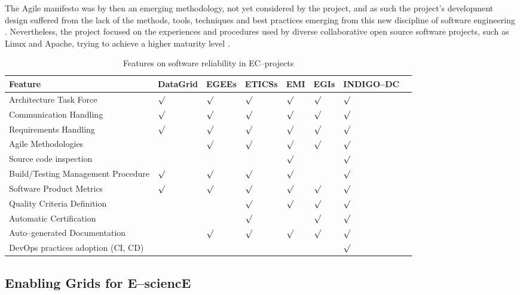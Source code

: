 \documentclass[journal]{IEEEtran}
\begin{document}
The Agile manifesto \cite{agile-manifesto} was by then an emerging methodology, not yet
considered by the project, and as such the project's
development design suffered from the lack of the methods, tools, techniques and best
practices emerging from this new discipline of software engineering
\cite{agile}. Nevertheless, the project focused on the experiences and procedures
used by diverse collaborative open source software projects, such as Linux and Apache, trying to
achieve a higher maturity level \cite{cmm}.

\begin{table}[!h]
\renewcommand{\arraystretch}{1.3}
\caption{Features on software reliability in EC--projects}
\label{tab:feat}
\centering
\begin{tabular}{llllllll}
\hline
\hline
Feature & DataGrid & EGEEs & ETICSs & EMI & EGIs & INDIGO--DC\\
\hline
\hline
Architecture Task Force            &$\surd$&$\surd$&$\surd$&$\surd$&$\surd$&$\surd$\\
Communication Handling             &$\surd$&$\surd$&$\surd$&$\surd$&$\surd$&$\surd$\\
Requirements Handling              &$\surd$&$\surd$&$\surd$&$\surd$&$\surd$&$\surd$\\
Agile Methodologies                &       &$\surd$&$\surd$&$\surd$&$\surd$&$\surd$\\
Source code inspection             &       &       &       &$\surd$&       &$\surd$\\
Build/Testing Management Procedure &$\surd$&$\surd$&$\surd$&$\surd$&       &$\surd$\\
Software Product Metrics           &$\surd$&$\surd$&$\surd$&$\surd$&$\surd$&$\surd$\\
Quality Criteria Definition        &       &       &$\surd$&$\surd$&$\surd$&$\surd$\\
Automatic Certification            &       &       &$\surd$&       &$\surd$&$\surd$\\
Auto--generated Documentation      &       &$\surd$&$\surd$&$\surd$&$\surd$&$\surd$\\
DevOps practices adoption (CI, CD) &       &       &       &       &       &$\surd$\\
\hline
\hline
\end{tabular}
\end{table}

\subsection{Enabling Grids for E--sciencE}
\end{document}
